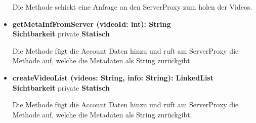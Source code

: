 \begin{itemize}
Die Methode schickt eine Anfrage an den ServerProxy zum holen der Videos.

\item \textbf{getMetaInfFromServer (videoId: int): String}\hfill\\
\textbf{Sichtbarkeit} private \newline
\textbf{Statisch}

Die Methode fügt die Account Daten hinzu und ruft am ServerProxy die Methode auf, welche die Metadaten als String zurückgibt.

\item \textbf{createVideoList (videos: String, info: String): LinkedList}\hfill\\
\textbf{Sichtbarkeit} private \newline
\textbf{Statisch}

Die Methode fügt die Account Daten hinzu und ruft am ServerProxy die Methode auf, welche die Metadaten als String zurückgibt.

\end{itemize}